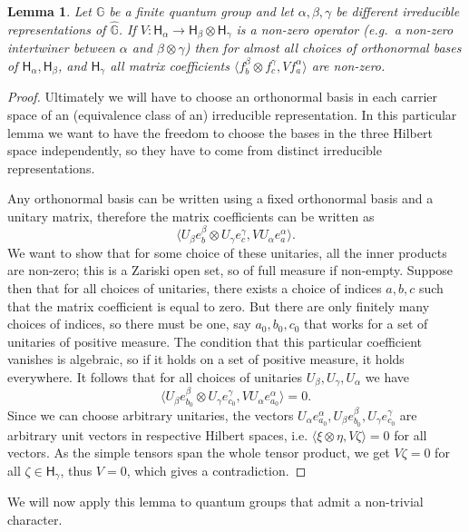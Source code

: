 \documentclass[12pt]{amsart}
\newtheorem{lem}[thm]{Lemma}
\theoremstyle{definition}
\theoremstyle{definition}
\theoremstyle{definition}
\theoremstyle{definition}
\newcommand{\G}{\mathbb{G}}
\numberwithin{equation}{section}
\begin{document}
\begin{lem}\label{lem:nonzerocoeff} Let $\G$ be a finite quantum group and 
let $\alpha, \beta, \gamma$ be different irreducible representations of $\widehat{\G}$. If $V: \mathsf{H}_{\alpha} \to \mathsf{H}_{\beta} \otimes \mathsf{H}_{\gamma}$ is a non-zero operator (e.g.\ a non-zero intertwiner between $\alpha$ and $\beta \otimes \gamma$) then for almost all choices of orthonormal bases of $\mathsf{H}_{\alpha}, \mathsf{H}_{\beta}$, and $\mathsf{H}_{\gamma}$ all matrix coefficients $\langle f^{\beta}_{b}\otimes f^{\gamma}_{c}, V f^{\alpha}_{a}\rangle$ are non-zero.
\end{lem}
\begin{proof}
Ultimately we will have to choose an orthonormal basis in each carrier space of an (equivalence class of an) irreducible representation. In this particular lemma we want to have the freedom to choose the bases in the three Hilbert space independently, so they have to come from distinct irreducible representations.

Any orthonormal basis can be written using a fixed orthonormal basis and a unitary matrix, therefore the matrix coefficients can be written as
\[
\langle U_{\beta}e^{\beta}_{b} \otimes U_{\gamma} e^{\gamma}_{c}, VU_{\alpha} e^{\alpha}_{a}\rangle.
\]
We want to show that for some choice of these unitaries, all the inner products are non-zero; this is a Zariski open set, so of full measure if non-empty. Suppose then that for all choices of unitaries, there exists a choice of indices $a,b,c$ such that the matrix coefficient is equal to zero. But there are only finitely many choices of indices, so there must be one, say $a_0, b_0, c_0$ that works for a set of unitaries of positive measure. The condition that this particular coefficient vanishes is algebraic, so if it holds on a set of positive measure, it holds everywhere. It follows that for all choices of unitaries $U_\beta, U_\gamma, U_\alpha$  we have
\[
\langle U_{\beta}e^{\beta}_{b_0} \otimes U_{\gamma} e^{\gamma}_{c_0}, VU_{\alpha} e^{\alpha}_{a_0}\rangle = 0.
\]
Since we can choose arbitrary unitaries, the vectors $U_{\alpha}e^{\alpha}_{a_0}, U_{\beta} e^{\beta}_{b_0}, U_{\gamma} e^{\gamma}_{c_0}$ are arbitrary unit vectors in respective Hilbert spaces, i.e. $\langle \xi \otimes \eta, V\zeta\rangle =0$ for all vectors. As the simple tensors span the whole tensor product, we get $V\zeta = 0$ for all $\zeta \in \mathsf{H}_{\gamma}$, thus $V=0$, which gives a contradiction.
\end{proof}
We will now apply this lemma to quantum groups that admit a non-trivial character.
\end{document}
